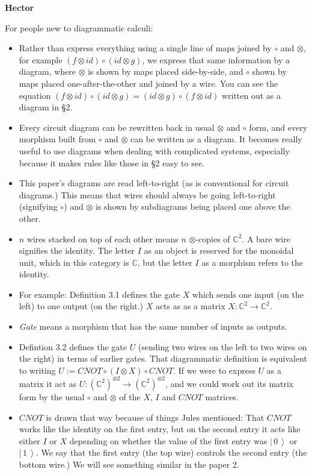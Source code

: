 \documentclass{amsart}
\newcommand{\respond}[1]{
  \vspace{1em} \textbf{#1}
}
\newcommand{\comp}{\circ}
\newcommand{\tensor}{\otimes}
\newcommand\ket[1]{\left|\, #1 \, \right>}
\begin{document}
\respond{Hector}
For people new to diagrammatic calculi:

\begin{itemize}
\item Rather than express everything using a single line of maps joined by $\comp$ and $\tensor$,
for example $ (f \tensor id ) \comp (id \tensor g)$,
we express that same information by a diagram, where $\tensor$ is shown by maps placed side-by-side,
and $\comp$ shown by maps placed one-after-the-other and joined by a wire.
You can see the equation $ (f \tensor id ) \comp (id \tensor g) = (id \tensor g) \comp (f \tensor id ) $
written out as a diagram in \S 2.

\item Every circuit diagram can be rewritten back in usual $\tensor$ and $\comp$ form,
and every morphism built from $\comp$ and $\tensor$ can be written as a diagram.
It becomes really useful to use diagrams when dealing with complicated systems,
especially because it makes rules like those in \S 2 easy to see.

\item This paper's diagrams are read left-to-right (as is conventional for circuit diagrams.)
This means that wires should always be going left-to-right (signifying $\comp$)
and $\tensor$ is shown by subdiagrams being placed one above the other.

\item $n$ wires stacked on top of each other means $n$ $\tensor$-copies of $\mathbb{C}^2$. A bare wire signifies the identity.
The letter $I$ as an object is reserved for the monoidal unit, which in this category is $\mathbb{C}$,
but the letter $I$ as a morphism refers to the identity.

\item For example: Definition 3.1 defines the gate $X$ which sends one input (on the left) to one output (on the right.)
$X$ acts as as a matrix $X: \mathbb C^2 \to \mathbb C^2$.

\item \emph{Gate} means a morphism that has the same number of inputs as outputs.

\item Defintion 3.2 defines the gate $U$ (sending two wires on the left to two wires on the right) in terms of earlier gates.
That diagrammatic definition is equivalent to writing $U := CNOT \comp ( I \tensor X) \comp CNOT$.
If we were to express $U$ as a matrix it act as $U: (\mathbb C^2)^{\tensor 2} \to (\mathbb C^2)^{\tensor 2}$,
and we could work out its matrix form by the usual $\comp$ and $\tensor$ of the $X$, $I$ and $CNOT$ matrices.

\item $CNOT$ is drawn that way because of things Jules mentioned:
That $CNOT$ works like the identity on the first entry,
but on the second entry it acts like either $I$ or $X$
depending on whether the value of the first entry was $\ket{0}$ or $\ket{1}$.
We say that the first entry (the top wire) controls the second entry (the bottom wire.)
We will see something similar in the paper 2.
\end{itemize}
\end{document}

